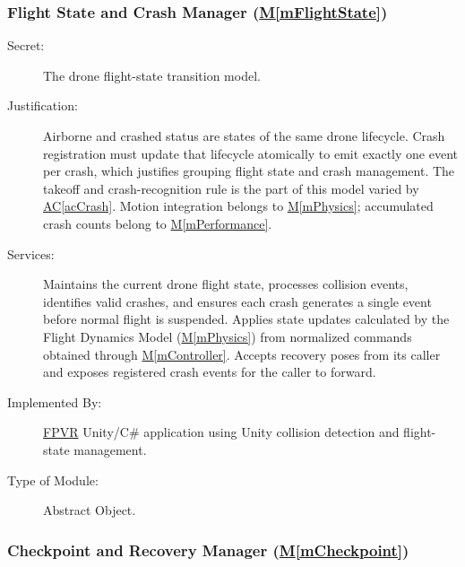 \documentclass[12pt, titlepage]{article}
\DeclareRobustCommand{\mgabbr}[2]{\hyperlink{mg-abbr:#1}{#2}}
\newcommand{\acref}[1]{\mgabbr{ac}{AC}\ref{#1}}
\newcommand{\mref}[1]{\hyperref[#1]{M\ref*{#1}}}
\begin{document}
\subsubsection{Flight State and Crash Manager (\mref{mFlightState})}

\begin{description}

\item[Secret:]
The drone flight-state transition model.

\item[Justification:]
Airborne and crashed status are states of the same drone lifecycle.
Crash registration must update that lifecycle atomically to emit exactly
one event per crash, which justifies grouping flight state and crash
management. The takeoff and crash-recognition rule is the part of this
model varied by \acref{acCrash}. Motion integration belongs to
\mref{mPhysics}; accumulated crash counts belong to \mref{mPerformance}.

\item[Services:]
Maintains the current drone flight state, processes
collision events, identifies valid crashes, and ensures
each crash generates a single event before normal
flight is suspended. Applies state updates calculated
by the Flight Dynamics Model (\mref{mPhysics}) from normalized commands
obtained through \mref{mController}. Accepts recovery poses from its caller
and exposes registered crash events for the caller to forward.

\item[Implemented By:]
\mgabbr{fpvr}{FPVR} Unity/C\# application using Unity collision
detection and flight-state management.

\item[Type of Module:]
Abstract Object.

\end{description}


\subsubsection{Checkpoint and Recovery Manager (\mref{mCheckpoint})}
\end{document}
